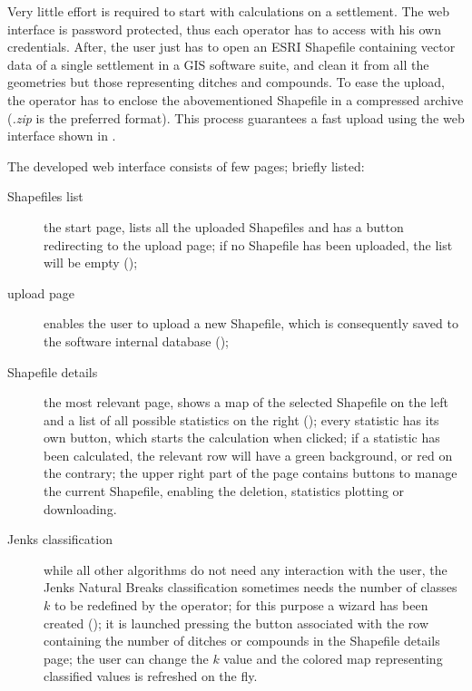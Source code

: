             Very little effort is required to start with calculations on a settlement. The web interface is password protected, thus each operator has to access with his own credentials. After, the user just has to open an ESRI Shapefile containing vector data of a single settlement in a GIS software suite, and clean it from all the geometries but those representing ditches and compounds. To ease the upload, the operator has to enclose the abovementioned Shapefile in a compressed archive (\emph{.zip} is the preferred format). This process guarantees a fast upload using the web interface shown in .
            
            The developed web interface consists of few pages; briefly listed:

            \begin{description}
                \item[Shapefiles list] the start page, lists all the uploaded Shapefiles and has a button redirecting to the upload page; if no Shapefile has been uploaded, the list will be empty ();
                \item[upload page] enables the user to upload a new Shapefile, which is consequently saved to the software internal database ();
                \item[Shapefile details] the most relevant page, shows a map of the selected Shapefile on the left and a list of all possible statistics on the right (); every statistic has its own button, which starts the calculation when clicked; if a statistic has been calculated, the relevant row will have a green background, or red on the contrary; the upper right part of the page contains buttons to manage the current Shapefile, enabling the deletion, statistics plotting or downloading.
                \item[Jenks classification] while all other algorithms do not need any interaction with the user, the Jenks Natural Breaks classification sometimes needs the number of classes $k$ to be redefined by the operator; for this purpose a wizard has been created (); it is launched pressing the button associated with the row containing the number of ditches or compounds in the Shapefile details page; the user can change the $k$ value and the colored map representing classified values is refreshed on the fly.
            \end{description}

            \pagebreak

